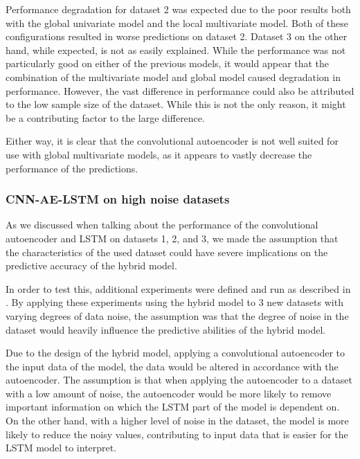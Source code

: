 Performance degradation for dataset 2 was expected due to the poor results both with the global univariate model and the local multivariate model.
Both of these configurations resulted in worse predictions on dataset 2.
Dataset 3 on the other hand, while expected, is not as easily explained.
While the performance was not particularly good on either of the previous models, it would appear that the combination of the multivariate model and global model
caused degradation in performance.
However, the vast difference in performance could also be attributed to the low sample size of the dataset.
While this is not the only reason, it might be a contributing factor to the large difference.

Either way, it is clear that the convolutional autoencoder is not well suited for use with global multivariate models, as it appears to
vastly decrease the performance of the predictions.








\subsubsection{CNN-AE-LSTM on high noise datasets}

As we discussed when talking about the performance of the convolutional autoencoder and LSTM on datasets 1, 2, and 3,
we made the assumption that the characteristics of the used dataset could have severe implications on the predictive accuracy of the hybrid model.

In order to test this, additional experiments were defined and run as described in .
By applying these experiments using the hybrid model to 3 new datasets with varying degrees of data noise,
the assumption was that the degree of noise in the dataset would heavily influence the predictive abilities of the hybrid model.

Due to the design of the hybrid model, applying a convolutional autoencoder to the input data of the model,
the data would be altered in accordance with the autoencoder.
The assumption is that when applying the autoencoder to a dataset with a low amount of noise,
the autoencoder would be more likely to remove important information on which the LSTM part of the model is dependent on.
On the other hand, with a higher level of noise in the dataset,
the model is more likely to reduce the noisy values, contributing to input data that is easier for the LSTM model to interpret.

